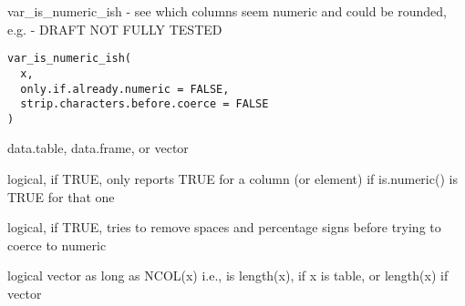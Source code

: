 \documentclass[a4paper]{book}
\begin{document}
%
\begin{Description}\relax
var\_is\_numeric\_ish - see which columns seem numeric and could be rounded, e.g. - DRAFT NOT FULLY TESTED
\end{Description}
%
\begin{Usage}
\begin{verbatim}
var_is_numeric_ish(
  x,
  only.if.already.numeric = FALSE,
  strip.characters.before.coerce = FALSE
)
\end{verbatim}
\end{Usage}
%
\begin{Arguments}
\begin{ldescription}
\item[\code{x}] data.table, data.frame, or vector

\item[\code{only.if.already.numeric}] logical, if TRUE, only reports TRUE for a column (or element) if  is.numeric() is TRUE for that one

\item[\code{strip.characters.before.coerce}] logical, if TRUE, tries to remove spaces and percentage signs before trying to coerce to numeric
\end{ldescription}
\end{Arguments}
%
\begin{Value}
logical vector as long as NCOL(x) i.e., is length(x), if x is table, or length(x) if vector
\end{Value}
%
\begin{SeeAlso}\relax
{}
\end{SeeAlso}
\printindex{}
\end{document}
